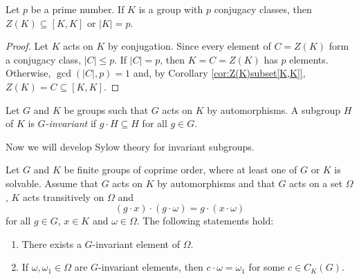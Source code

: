 \begin{corollary}
  Let $p$ be a prime number. If $K$ is a group with $p$ conjugacy classes, then 
  $Z(K)\subseteq[K,K]$ or $|K|=p$. 
\end{corollary}

\begin{proof}
  Let $K$ acts on $K$ by conjugation. Since every element of $C=Z(K)$
  form a conjugacy class, $|C|\leq p$. If $|C|=p$, then $K=C=Z(K)$
  has $p$ elements. Otherwise, $\gcd(|C|,p)=1$ and, by Corollary \ref{cor:Z(K)subset[K,K]}, $Z(K)=C\subseteq
 [K,K]$.
\end{proof}

Let $G$ and $K$ be groups such that $G$ acts on $K$ by automorphisms.
A subgroup $H$ of $K$ is {\em $G$-invariant} if $g\cdot H\subseteq H$ for all $g\in G$. 


Now we will develop Sylow theory for invariant subgroups. 



\begin{lemma}[Glauberman]
	Let $G$ and $K$ be finite groups of coprime order, where at least one of $G$ or $K$ is solvable. 
	Assume that $G$ acts on $K$ by automorphisms and that
	$G$ acts on a set $\Omega$,
	$K$ acts transitively on $\Omega$ and  
	\[
	(g\cdot x)\cdot (g\cdot\omega)=g\cdot (x\cdot\omega)
	\]
	for all $g\in G$, $x\in K$ and $\omega\in\Omega$. 
	The following statements hold:
	\begin{enumerate}
	\item There exists a $G$-invariant element of $\Omega$.
	\item If $\omega,\omega_1\in\Omega$ are $G$-invariant elements, then 
	$c\cdot\omega=\omega_1$ for some $c\in C_K(G)$. 
	\end{enumerate}
\end{lemma}


